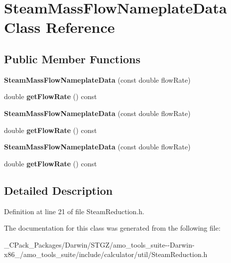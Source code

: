 \hypertarget{class_steam_mass_flow_nameplate_data}{}\section{Steam\+Mass\+Flow\+Nameplate\+Data Class Reference}
\label{class_steam_mass_flow_nameplate_data}
\subsection*{Public Member Functions}
\begin{DoxyCompactItemize}
\item 
\mbox{\label{class_steam_mass_flow_nameplate_data_a306574e563d384af34e862b705d32b4b}} 
{\bfseries Steam\+Mass\+Flow\+Nameplate\+Data} (const double flow\+Rate)
\item 
\mbox{\label{class_steam_mass_flow_nameplate_data_a02d1552af9df313825c624401526188b}} 
double {\bfseries get\+Flow\+Rate} () const
\item 
\mbox{\label{class_steam_mass_flow_nameplate_data_a306574e563d384af34e862b705d32b4b}} 
{\bfseries Steam\+Mass\+Flow\+Nameplate\+Data} (const double flow\+Rate)
\item 
\mbox{\label{class_steam_mass_flow_nameplate_data_a02d1552af9df313825c624401526188b}} 
double {\bfseries get\+Flow\+Rate} () const
\item 
\mbox{\label{class_steam_mass_flow_nameplate_data_a306574e563d384af34e862b705d32b4b}} 
{\bfseries Steam\+Mass\+Flow\+Nameplate\+Data} (const double flow\+Rate)
\item 
\mbox{\label{class_steam_mass_flow_nameplate_data_a02d1552af9df313825c624401526188b}} 
double {\bfseries get\+Flow\+Rate} () const
\end{DoxyCompactItemize}


\subsection{Detailed Description}


Definition at line 21 of file Steam\+Reduction.\+h.



The documentation for this class was generated from the following file\+:\begin{DoxyCompactItemize}
\item 
\+\_\+\+C\+Pack\+\_\+\+Packages/\+Darwin/\+S\+T\+G\+Z/amo\+\_\+tools\+\_\+suite-\/-\/\+Darwin-\/x86\+\_/amo\+\_\+tools\+\_\+suite/include/calculator/util/Steam\+Reduction.\+h\end{DoxyCompactItemize}
